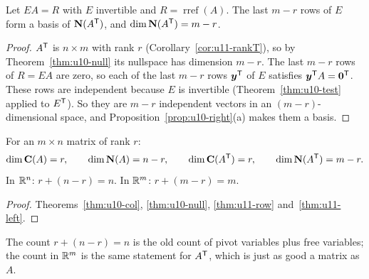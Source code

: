 \begin{theorem}\label{thm:u11-left}
Let $EA=R$ with $E$ invertible and $R=\operatorname{rref}(A)$. The last $m-r$ rows of $E$ form a
basis of $\mathbf{N}(A^{\mathsf{T}})$, and $\dim\mathbf{N}(A^{\mathsf{T}})=m-r$.
\end{theorem}
\begin{proof}
$A^{\mathsf{T}}$ is $n\times m$ with rank $r$ (Corollary~\ref{cor:u11-rankT}), so by
Theorem~\ref{thm:u10-null} its nullspace has dimension $m-r$. The last $m-r$ rows of $R=EA$ are
zero, so each of the last $m-r$ rows $\boldsymbol{y}^{\mathsf{T}}$ of $E$ satisfies $\boldsymbol{y}^{\mathsf{T}} A=\boldsymbol{0}^{\mathsf{T}}$. These rows
are independent because $E$ is invertible (Theorem~\ref{thm:u10-test} applied to $E^{\mathsf{T}}$). So they
are $m-r$ independent vectors in an $(m-r)$-dimensional space, and Proposition~\ref{prop:u10-right}(a)
makes them a basis.
\end{proof}

\begin{theorem}\label{thm:u11-dims}
For an $m\times n$ matrix of rank $r$:
\[
\dim\mathbf{C}(A)=r,\qquad \dim\mathbf{N}(A)=n-r,\qquad \dim\mathbf{C}(A^{\mathsf{T}})=r,\qquad \dim\mathbf{N}(A^{\mathsf{T}})=m-r.
\]
In $\mathbb{R}^n$: $r+(n-r)=n$. In $\mathbb{R}^m$: $r+(m-r)=m$.
\end{theorem}
\begin{proof}
Theorems~\ref{thm:u10-col}, \ref{thm:u10-null}, \ref{thm:u11-row} and~\ref{thm:u11-left}.
\end{proof}

The count $r+(n-r)=n$ is the old count of pivot variables plus free variables; the count in $\mathbb{R}^m$
is the same statement for $A^{\mathsf{T}}$, which is just as good a matrix as $A$.

